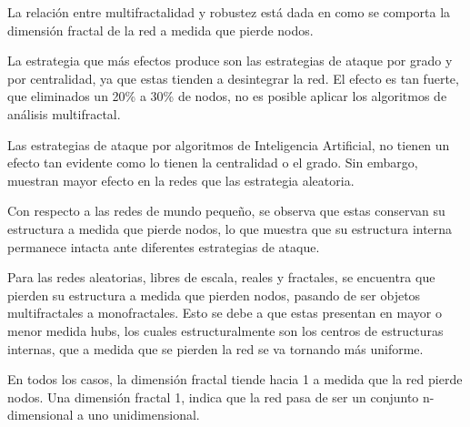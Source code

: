 La relación entre multifractalidad y robustez está dada en como se comporta la dimensión fractal de la red a medida que pierde nodos.

La estrategia que más efectos produce son las estrategias de ataque por grado y por centralidad, ya que estas tienden a desintegrar la red. El efecto es tan fuerte, que eliminados un 20\% a 30\% de nodos, no es posible aplicar los algoritmos de análisis multifractal.

Las estrategias de ataque por algoritmos de Inteligencia Artificial, no tienen un efecto tan evidente como lo tienen la centralidad o el grado. Sin embargo, muestran mayor efecto en la redes que las estrategia aleatoria.

Con respecto a las redes de mundo pequeño, se observa que estas conservan su estructura a medida que pierde nodos, lo que muestra que su estructura interna permanece intacta ante diferentes estrategias de ataque.

Para las redes aleatorias, libres de escala, reales y fractales, se encuentra que pierden su estructura a medida que pierden nodos, pasando de ser objetos multifractales a monofractales. Esto se debe a que estas presentan en mayor o menor medida hubs, los cuales estructuralmente son los centros de estructuras internas, que a medida que se pierden la red se va tornando más uniforme.

En todos los casos, la dimensión fractal tiende hacia 1 a medida que la red pierde nodos. Una dimensión fractal 1, indica que la red pasa de ser un conjunto n-dimensional a uno unidimensional.
